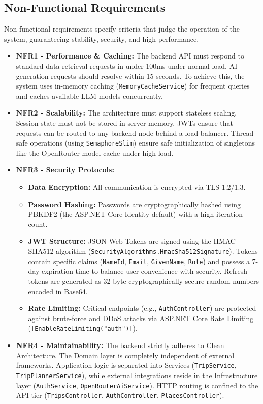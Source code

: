 \subsection{Non-Functional Requirements}
Non-functional requirements specify criteria that judge the operation of the system, guaranteeing stability, security, and high performance.
\begin{itemize}
    \item \textbf{NFR1 - Performance \& Caching:} The backend API must respond to standard data retrieval requests in under 100ms under normal load. AI generation requests should resolve within 15 seconds. To achieve this, the system uses in-memory caching (\texttt{MemoryCacheService}) for frequent queries and caches available LLM models concurrently.
    \item \textbf{NFR2 - Scalability:} The architecture must support stateless scaling. Session state must not be stored in server memory. JWTs ensure that requests can be routed to any backend node behind a load balancer. Thread-safe operations (using \texttt{SemaphoreSlim}) ensure safe initialization of singletons like the OpenRouter model cache under high load.
    \item \textbf{NFR3 - Security Protocols:}
    \begin{itemize}
        \item \textbf{Data Encryption:} All communication is encrypted via TLS 1.2/1.3.
        \item \textbf{Password Hashing:} Passwords are cryptographically hashed using PBKDF2 (the ASP.NET Core Identity default) with a high iteration count.
        \item \textbf{JWT Structure:} JSON Web Tokens are signed using the HMAC-SHA512 algorithm (\texttt{SecurityAlgorithms.HmacSha512Signature}). Tokens contain specific claims (\texttt{NameId}, \texttt{Email}, \texttt{GivenName}, \texttt{Role}) and possess a 7-day expiration time to balance user convenience with security. Refresh tokens are generated as 32-byte cryptographically secure random numbers encoded in Base64.
        \item \textbf{Rate Limiting:} Critical endpoints (e.g., \texttt{AuthController}) are protected against brute-force and DDoS attacks via ASP.NET Core Rate Limiting (\texttt{[EnableRateLimiting("auth")]}).
    \end{itemize}
    \item \textbf{NFR4 - Maintainability:} The backend strictly adheres to Clean Architecture. The Domain layer is completely independent of external frameworks. Application logic is separated into Services (\texttt{TripService}, \texttt{TripPlannerService}), while external integrations reside in the Infrastructure layer (\texttt{AuthService}, \texttt{OpenRouterAiService}). HTTP routing is confined to the API tier (\texttt{TripsController}, \texttt{AuthController}, \texttt{PlacesController}).
\end{itemize}

